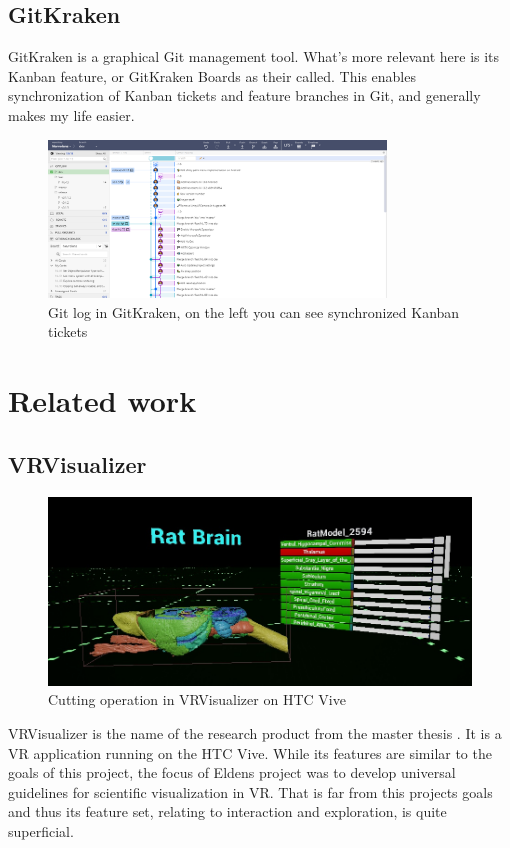 \subsection*{GitKraken}\label{chap:gitkraken}
GitKraken is a graphical Git management tool. What's more relevant here is its Kanban feature, or GitKraken Boards as their called. This enables synchronization of Kanban tickets and feature branches in Git, and generally makes my life easier.
\begin{figure}[ht]
    \centering
    \includegraphics[width=0.8\textwidth]{fig/gitkraken}
    \caption{Git log in GitKraken, on the left you can see synchronized Kanban tickets}
\end{figure}


\section{Related work}

\subsection*{VRVisualizer}\label{chap:vrvis}
\begin{figure}[ht]
    \centering
    \includegraphics[width=\textwidth]{fig/vrvis_ratbrain.jpg}
    \caption{Cutting operation in VRVisualizer on HTC Vive}
\end{figure}
VRVisualizer is the name of the research product from the master thesis \citet{Elden2017}. It is a VR application running on the HTC Vive. While its features are similar to the goals of this project, the focus of Eldens project was to develop universal guidelines for scientific visualization in VR. That is far from this projects goals and thus its feature set, relating to interaction and exploration, is quite superficial.


